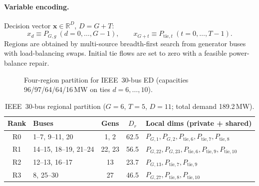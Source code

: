 \paragraph{Variable encoding.}
Decision vector $\mathbf{x}\in\mathbb{R}^{D}$, $D=G+T$:
\begin{equation}
x_d \equiv P_{G,g}\ (d=0,\ldots,G-1),\qquad
x_{G+t}\equiv P_{\mathrm{tie},t}\ (t=0,\ldots,T-1).
\label{eq:app_ieee_encoding}
\end{equation}
Regions are obtained by multi-source breadth-first search from generator buses with load-balancing swaps. Initial tie flows are set to zero with a feasible power-balance repair.

\begin{figure}[H]
\centering
{}
\caption{Four-region partition for IEEE~30-bus ED (capacities 96/97/64/64/16\,MW on ties $d=6,\ldots,10$).}
\label{fig:ieee30_partition}
\end{figure}

\begin{table}[H]
\centering
\caption{IEEE~30-bus regional partition ($G{=}6$, $T{=}5$, $D{=}11$; total demand 189.2\,MW).}
\label{tab:ieee30_partition}
\begin{tabular}{@{}clccp{}@{}}
\toprule
\textbf{Rank} & \textbf{Buses} & \textbf{Gens} & \textbf{$D_r$} & \textbf{Local dims (private + shared)} \\
\midrule
R0 & 1--7, 9--11, 20 & 1, 2 & 62.5 & $P_{G,1},P_{G,2},P_{\mathrm{tie},6},P_{\mathrm{tie},7},P_{\mathrm{tie},8}$ \\
R1 & 14--15, 18--19, 21--24 & 22, 23 & 56.5 & $P_{G,22},P_{G,23},P_{\mathrm{tie},6},P_{\mathrm{tie},9},P_{\mathrm{tie},10}$ \\
R2 & 12--13, 16--17 & 13 & 23.7 & $P_{G,13},P_{\mathrm{tie},7},P_{\mathrm{tie},9}$ \\
R3 & 8, 25--30 & 27 & 46.5 & $P_{G,27},P_{\mathrm{tie},8},P_{\mathrm{tie},10}$ \\
\bottomrule
\end{tabular}
\end{table}

